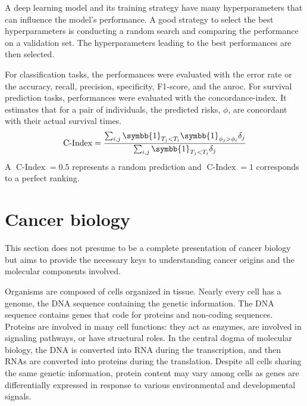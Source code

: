 \documentclass[../main.tex]{subfiles}
\begin{document}
	 A deep learning model and its training strategy have many hyperparameters that can influence the model's performance.
	 A good strategy to select the best hyperparameters is conducting a random search and comparing the performance on a validation set.
	 The hyperparameters leading to the best performances are then selected.

	 For classification tasks, the performances were evaluated with the error rate or the accuracy, recall, precision, specificity, F1-score, and the \gls{auroc}.
	 For survival prediction tasks, performances were evaluated with the concordance-index.
	 It estimates that for a pair of individuals, the predicted risks, \(\phi\),  are concordant with their actual survival times.
	 \begin{equation}
		 \operatorname{C-Index} = \frac{\sum_{i,j}\symbb{1}_{T_j < T_i}\symbb{1}_{\phi_j > \phi_i}\delta_j}{\sum_{i,j}\symbb{1}_{T_j < T_i}\delta_j}
	 \end{equation}
	 A \(\operatorname{C-Index} = 0.5\) represents a random prediction and \(\operatorname{C-Index} = 1\) corresponds to a perfect ranking.

\section{Cancer biology}
 This section does not presume to be a complete presentation of cancer biology but aims to provide the necessary keys to understanding cancer origins and the molecular components involved.

 Organisms are composed of cells organized in tissue.
 Nearly every cell has a genome, the DNA sequence containing the genetic information.
 The DNA sequence contains genes that code for proteins and non-coding sequences.
 Proteins are involved in many cell functions: they act as enzymes, are involved in signaling pathways, or have structural roles.
 In the central dogma of molecular biology, the DNA is converted into RNA  during the transcription, and then RNAs are converted into proteins during the translation.
 Despite all cells sharing the same genetic information, protein content may vary among cells as genes are differentially expressed in response to various environmental and developmental signals.
\end{document}
